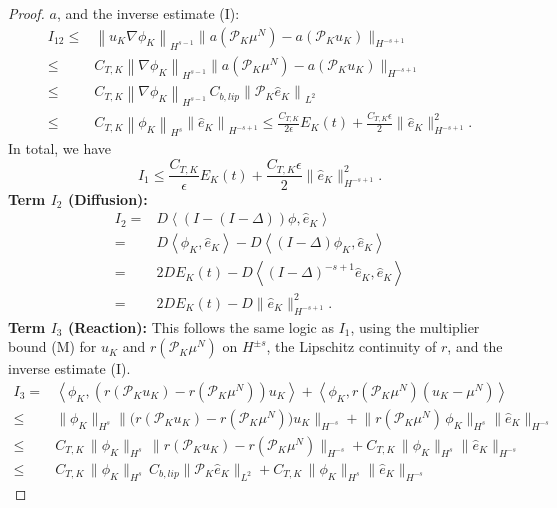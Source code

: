\documentclass[a4paper,fleqn]{cas-sc}
\theoremstyle{definition}
\theoremstyle{remark}
\begin{document}
\begin{proof}
$a$, and the inverse estimate (I):
\[
\begin{aligned}
     I_{12} \leq & \left\|u_K \nabla \phi_K\right\|_{H^{s-1}} \bigl\| a(\mathcal  P_K \mu^N) - a(\mathcal P_K u_K)\bigr\|_{H^{-s+1}}\\
     \leq&  C_{T,K}\left\|\nabla  \phi_K\right\|_{H^{s-1}} \bigl\| a(\mathcal  P_K \mu^N) - a(\mathcal P_K u_K)\bigr\|_{H^{-s+1}}\\
     \leq&  C_{T,K}\left\|\nabla  \phi_K\right\|_{H^{s-1}} \,C_{b,lip}\left\|\mathcal P_K\hat{e}_K\right\|_{L^2} \\
     \leq & C_{T,K}\left\| \phi_K\right\|_{H^{s}} \left\|\hat{e}_K \right\|_{H^{-s+1}}
     \leq \frac{C_{T,K}}{2\epsilon}E_K(t)
        + \frac{C_{T,K}\epsilon}{2}\|\hat{e}_K\|^2_{H^{-s+1}}.
\end{aligned}
\]
In total, we have
\[
I_1\leq \frac{C_{T,K}}{\epsilon}E_K(t)
        + \frac{C_{T,K}\epsilon}{2}\|\hat{e}_K\|^2_{H^{-s+1}}.
\]
\textbf{Term $I_2$ (Diffusion): }
\[
\begin{aligned}
I_{2} = & D\left\langle (I-(I-\Delta))  \phi ,  \hat{e}_K \right\rangle\\
   =& D\left\langle  \phi_K ,  \hat{e}_K \right\rangle -  D\left\langle (I-\Delta)  \phi_K ,  \hat{e}_K \right\rangle\\
   = & 2D E_K(t) - D\left\langle (I-\Delta)^{-s+1}  \hat{e}_K ,  \hat{e}_K \right\rangle\\
   = & 2D E_K(t) - D\|\hat{e}_K\|_{H^{-s+1}}^2.
\end{aligned}
\]
\textbf{Term $I_3$ (Reaction):} This follows the same logic as $I_1$, using the
multiplier bound (M) for $u_K$ and $r(\mathcal P_K\mu^N)$ on $H^{\pm s}$, the Lipschitz
continuity of $r$, and the inverse estimate (I).
\[
\begin{aligned}
I_3 
=& \left\langle   \phi_K , \left(r\left(\mathcal P_K u_K\right)-r\left(\mathcal P_K \mu^N\right)\right)u_K\right\rangle 
+ \left\langle   \phi_K , r(\mathcal P_K \mu^N)\left(u_K-\mu^N\right) \right\rangle \\
\leq & \|\phi_K\|_{H^s}\bigl\|\bigl(r(\mathcal P_K u_K)-r(\mathcal P_K\mu^N)\bigr)u_K\bigr\|_{H^{-s}}
+ \bigl\|r(\mathcal P_K\mu^N)\,\phi_K\bigr\|_{H^s}\|\hat e_K\|_{H^{-s}} \\
\leq & C_{T,K}\,\|\phi_K\|_{H^s}\,\bigl\|r(\mathcal P_K u_K)-r(\mathcal P_K\mu^N)\bigr\|_{H^{-s}}
+ C_{T,K}\,\|\phi_K\|_{H^s}\|\hat e_K\|_{H^{-s}} \\
\leq & C_{T,K}\,\|\phi_K\|_{H^s}\,C_{b,lip}\|\mathcal P_K\hat e_K\|_{L^2}
+ C_{T,K}\,\|\phi_K\|_{H^s}\|\hat e_K\|_{H^{-s}}

\end{aligned}\]
\end{proof}
\end{document}
